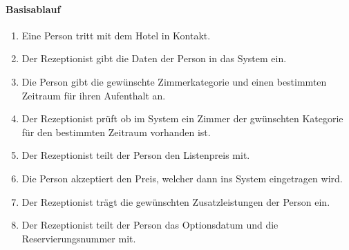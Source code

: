 \paragraph{Basisablauf}
\begin{enumerate}
	\item Eine Person tritt mit dem Hotel in Kontakt.
	\item Der \Gls{Rezeptionist} gibt die Daten der Person in das System ein.
	\item Die Person gibt die gewünschte Zimmerkategorie und einen bestimmten Zeitraum für ihren Aufenthalt an. 
    \item Der \Gls{Rezeptionist} prüft ob im System ein Zimmer der gwünschten Kategorie für den bestimmten Zeitraum vorhanden ist. 
	\item Der \Gls{Rezeptionist} teilt der Person den Listenpreis mit.
	\item Die Person akzeptiert den Preis, welcher dann ins System eingetragen wird.
	\item Der \Gls{Rezeptionist} trägt die gewünschten \Gls{Zusatzleistung}en der Person ein.
	\item Der \Gls{Rezeptionist} teilt der Person das \Gls{Optionsdatum} und die \Gls{Reservierungsnummer} mit.
\end{enumerate}

